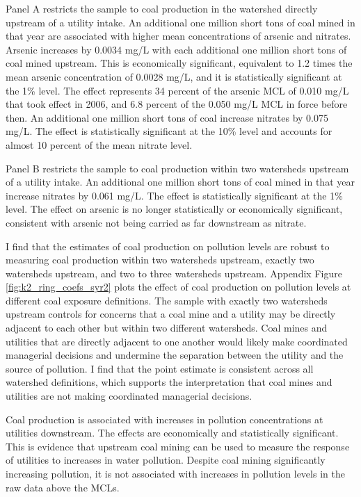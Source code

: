 \documentclass[12pt]{article}
\begin{document}
Panel A restricts the sample to coal production in the watershed directly upstream of a utility intake. An additional one million short tons of coal mined in that year are associated with higher mean concentrations of arsenic and nitrates. Arsenic increases by 0.0034 mg/L with each additional one million short tons of coal mined upstream. This is economically significant, equivalent to 1.2 times the mean arsenic concentration of 0.0028 mg/L, and it is statistically significant at the 1\% level. The effect represents 34 percent of the arsenic MCL of 0.010 mg/L that took effect in 2006, and 6.8 percent of the 0.050 mg/L MCL in force before then. An additional one million short tons of coal increase nitrates by 0.075 mg/L. The effect is statistically significant at the 10\% level and accounts for almost 10 percent of the mean nitrate level.

Panel B restricts the sample to coal production within two watersheds upstream of a utility intake. An additional one million short tons of coal mined in that year increase nitrates by 0.061 mg/L. The effect is statistically significant at the 1\% level. The effect on arsenic is no longer statistically or economically significant, consistent with arsenic not being carried as far downstream as nitrate.

I find that the estimates of coal production on pollution levels are robust to measuring coal production within two watersheds upstream, exactly two watersheds upstream, and two to three watersheds upstream. Appendix Figure \ref{fig:k2_ring_coefs_syr2} plots the effect of coal production on pollution levels at different coal exposure definitions. The sample with exactly two watersheds upstream controls for concerns that a coal mine and a utility may be directly adjacent to each other but within two different watersheds. Coal mines and utilities that are directly adjacent to one another would likely make coordinated managerial decisions and undermine the separation between the utility and the source of pollution. I find that the point estimate is consistent across all watershed definitions, which supports the interpretation that coal mines and utilities are not making coordinated managerial decisions.


Coal production is associated with increases in pollution concentrations at utilities downstream. The effects are economically and statistically significant. This is evidence that upstream coal mining can be used to measure the response of utilities to increases in water pollution. Despite coal mining significantly increasing pollution, it is not associated with increases in pollution levels in the raw data above the MCLs. 
\end{document}
